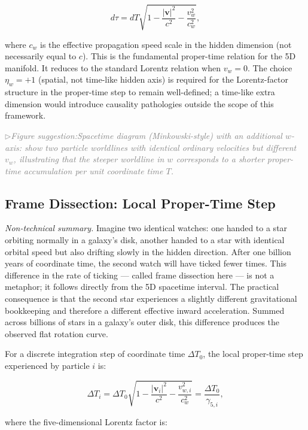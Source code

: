 \documentclass[11pt,a4paper]{article}
\newcommand{\figsuggest}[1]{%
  \medskip
  \noindent\hspace{0pt}\textcolor{gray}{\small\itshape
    $\triangleright$\;Figure suggestion:\enspace #1}%
  \medskip}
\begin{document}
\begin{keybox}
\[
  d\tau = dT\sqrt{1 - \frac{|\mathbf{v}|^2}{c^2} - \frac{v_w^2}{c_w^2}} ,
\]
\end{keybox}

\noindent
where $c_w$ is the effective propagation speed scale in the hidden dimension
(not necessarily equal to $c$).  This is the fundamental proper-time relation
for the 5D manifold.  It reduces to the standard Lorentz relation when
$v_w = 0$.  The choice $\eta_w = +1$ (spatial, not time-like hidden axis)
is required for the Lorentz-factor structure in the proper-time step to
remain well-defined; a time-like extra dimension would introduce causality
pathologies outside the scope of this framework.

\figsuggest{Spacetime diagram (Minkowski-style) with an additional $w$-axis:
show two particle worldlines with identical ordinary velocities but different
$v_w$, illustrating that the steeper worldline in $w$ corresponds to a shorter
proper-time accumulation per unit coordinate time $T$.}

\subsection{Frame Dissection: Local Proper-Time Step}\label{sec:frame}

\textit{Non-technical summary.}\enspace
Imagine two identical watches: one handed to a star orbiting normally in a
galaxy's disk, another handed to a star with identical orbital speed but also
drifting slowly in the hidden direction.  After one billion years of coordinate
time, the second watch will have ticked fewer times.  This difference in the
rate of ticking --- called frame dissection here --- is not a metaphor; it
follows directly from the 5D spacetime interval.  The practical consequence is
that the second star experiences a slightly different gravitational bookkeeping
and therefore a different effective inward acceleration.  Summed across billions
of stars in a galaxy's outer disk, this difference produces the observed flat
rotation curve.

For a discrete integration step of coordinate time $\Delta T_0$, the local
proper-time step experienced by particle $i$ is:

\[
  \Delta T_i
  = \Delta T_0 \sqrt{1 - \frac{|\mathbf{v}_i|^2}{c^2} - \frac{v_{w,i}^2}{c_w^2}}
  = \frac{\Delta T_0}{\gamma_{5,i}} ,
\]

where the five-dimensional Lorentz factor is:
\end{document}
